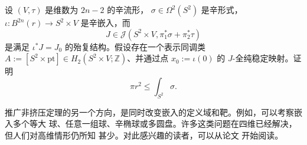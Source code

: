 \begin{exercise}\label{ex:9-3-8}
设 $(V,\tau)$ 是维数为 $2n-2$ 的辛流形，
$\sigma\in\Omega^2(S^2)$ 是辛形式，
$\iota:B^{2n}(r)\to S^2\times V$ 是辛嵌入，而
\[
  J\in\mathcal J(S^2\times V,\pi_1^*\sigma+\pi_2^*\tau)
\]
是满足 $\iota^*J=J_0$ 的殆复结构。假设存在一个表示同调类
$A:=[S^2\times\mathrm{pt}]\in H_2(S^2\times V;\mathbb Z)$、并通过点
$x_0:=\iota(0)$ 的 $J$-全纯稳定映射。证明
\begin{equation}\label{eq:9-3-2}
  \pi r^2\le\int_{S^2}\sigma.
\end{equation}
\end{exercise}

\begin{remark}[辛嵌入问题]\label{rem:9-3-9}
推广非挤压定理的另一个方向，是同时改变嵌入的定义域和靶。例如，可以考察嵌入多个等大
球、任意一组球、辛椭球或多圆盘。许多这类问题在四维已经解决，但人们对高维情形仍所知
甚少。对此感兴趣的读者，可以从论文  开始阅读。
\end{remark}
